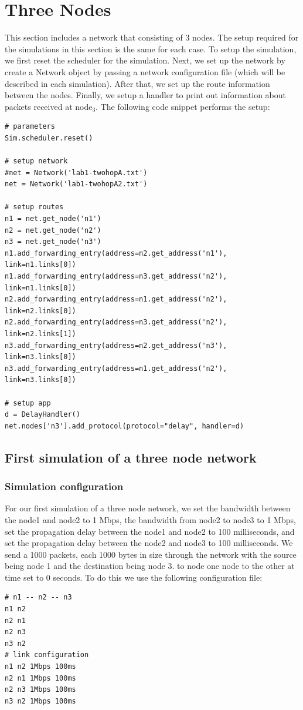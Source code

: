 \documentclass[fleqn,11pt]{article}
\begin{document}
\section{Three Nodes}
This section includes a network that consisting of 3 nodes. The setup required for the simulations in this section is the same for each case. To setup the simulation, we first reset the scheduler for the simulation. Next, we set up the network by create a Network object by passing a network configuration file (which will be described in each simulation). After that, we set up the route information between the nodes. Finally, we setup a handler to print out information about packets received at node$_3$. The following code snippet performs the setup:
\begin{lstlisting}
# parameters
Sim.scheduler.reset()

# setup network
#net = Network('lab1-twohopA.txt')
net = Network('lab1-twohopA2.txt')

# setup routes
n1 = net.get_node('n1')
n2 = net.get_node('n2')
n3 = net.get_node('n3')
n1.add_forwarding_entry(address=n2.get_address('n1'), link=n1.links[0])
n1.add_forwarding_entry(address=n3.get_address('n2'), link=n1.links[0])
n2.add_forwarding_entry(address=n1.get_address('n2'), link=n2.links[0])
n2.add_forwarding_entry(address=n3.get_address('n2'), link=n2.links[1])
n3.add_forwarding_entry(address=n2.get_address('n3'), link=n3.links[0])
n3.add_forwarding_entry(address=n1.get_address('n2'), link=n3.links[0])

# setup app
d = DelayHandler()
net.nodes['n3'].add_protocol(protocol="delay", handler=d)
\end{lstlisting}
\subsection{First simulation of a three node network}
\subsubsection{Simulation configuration}
For our first simulation of a three node network, we set the bandwidth between the node1 and node2 to 1 Mbps, the bandwidth from node2 to node3 to 1 Mbps, set the propagation delay between the node1 and node2 to 100 milliseconds, and set the propagation delay between the node2 and node3 to 100 milliseconds. We send a 1000 packets, each 1000 bytes in size through the network with the source being node 1 and the destination being node 3.  to node one node to the other at time set to 0 seconds. To do this we use the following configuration file:
\begin{lstlisting}
# n1 -- n2 -- n3
n1 n2
n2 n1
n2 n3
n3 n2
# link configuration
n1 n2 1Mbps 100ms
n2 n1 1Mbps 100ms
n2 n3 1Mbps 100ms
n3 n2 1Mbps 100ms
\end{lstlisting}
\end{document}
